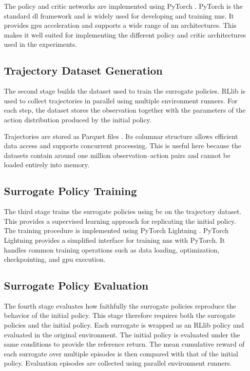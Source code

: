 The policy and critic networks are implemented using PyTorch \parencite{paszke2019pytorch}.
PyTorch is the standard \gls{dl} framework and is widely used for developing and training \glspl{nn}.
It provides \gls{gpu} acceleration and supports a wide range of \gls{nn} architectures.
This makes it well suited for implementing the different policy and critic architectures used in the experiments.

\subsection{Trajectory Dataset Generation}

The second stage builds the dataset used to train the surrogate policies.
RLlib is used to collect trajectories in parallel using multiple environment runners.
For each step, the dataset stores the observation together with the parameters of the action distribution produced by the initial policy.

Trajectories are stored as Parquet files \parencite{arrow}.
Its columnar structure allows efficient data access and supports concurrent processing.
This is useful here because the datasets contain around one million observation--action pairs and cannot be loaded entirely into memory.

\subsection{Surrogate Policy Training}

The third stage trains the surrogate policies using \gls{bc} on the trajectory dataset.
This provides a supervised learning approach for replicating the initial policy.
The training procedure is implemented using PyTorch Lightning \parencite{falcon2019lightning}.
PyTorch Lightning provides a simplified interface for training \glspl{nn} with PyTorch.
It handles common training operations such as data loading, optimization, checkpointing, and \gls{gpu} execution.

\subsection{Surrogate Policy Evaluation}

The fourth stage evaluates how faithfully the surrogate policies reproduce the behavior of the initial policy.
This stage therefore requires both the surrogate policies and the initial policy.
Each surrogate is wrapped as an RLlib policy and evaluated in the original environment.
The initial policy is evaluated under the same conditions to provide the reference return.
The mean cumulative reward of each surrogate over multiple episodes is then compared with that of the initial policy.
Evaluation episodes are collected using parallel environment runners.

